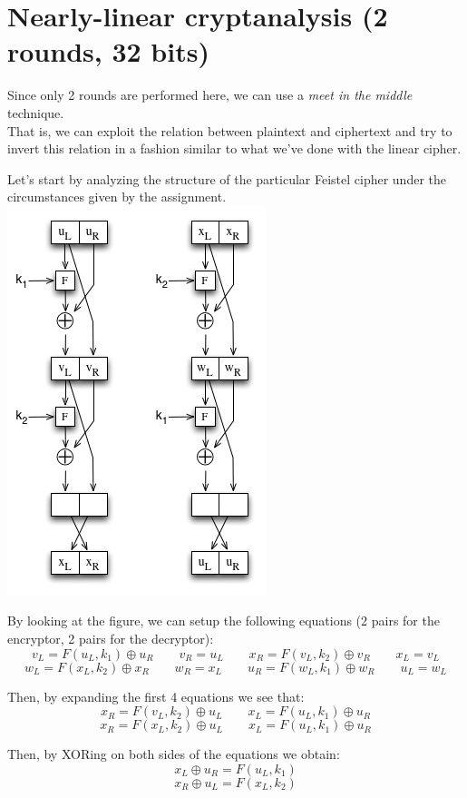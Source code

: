\documentclass[a4paper,12pt,titlepage]{article}
\begin{document}
\section{Nearly-linear cryptanalysis (2 rounds, 32 bits)}
Since only 2 rounds are performed here, we can use a \emph{meet in the middle}
technique. \\
That is, we can exploit the relation between plaintext and ciphertext and try
to invert this relation in a fashion similar to what we've done with the linear
cipher.

Let's start by analyzing the structure of the particular Feistel cipher under
the circumstances given by the assignment. \\

\includegraphics{2_rounds_feistel.jpg}

By looking at the figure, we can setup the following equations (2 pairs for the
encryptor, 2 pairs for the decryptor):
\[v_L = F(u_L, k_1) \oplus u_R \qquad v_R = u_L \qquad x_R = F(v_L, k_2) \oplus v_R \qquad x_L = v_L\]
\[w_L = F(x_L, k_2) \oplus x_R \qquad w_R = x_L \qquad u_R = F(w_L, k_1) \oplus w_R \qquad u_L = w_L\]

Then, by expanding the first 4 equations we see that:
\[ x_R = F(v_L, k_2) \oplus u_L \qquad x_L = F(u_L, k_1) \oplus u_R \]
\[ x_R = F(x_L, k_2) \oplus u_L \qquad x_L = F(u_L, k_1) \oplus u_R \]

Then, by XORing on both sides of the equations we obtain:
\[x_L \oplus u_R = F(u_L, k_1)\]
\[x_R \oplus u_L = F(x_L, k_2)\]
\end{document}
